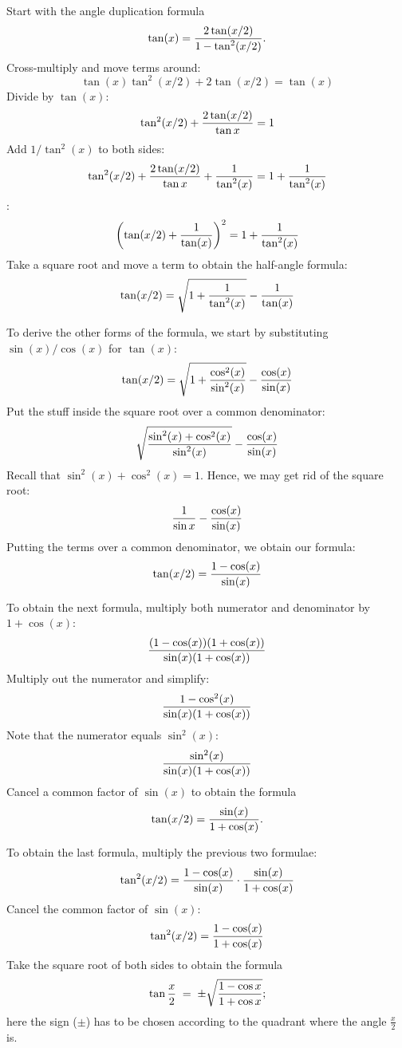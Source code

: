 \documentclass[12pt]{article}
\begin{document}
Start with the angle duplication formula
\[
\tan (x) = {2 \tan (x/2) \over 1 - \tan^2 (x/2)}.
\]
Cross-multiply and move terms around:
\[
\tan (x) \tan^2 (x/2) + 2 \tan (x/2) = \tan (x)
\]
Divide by $\tan (x)$:
\[
\tan^2 (x/2) + {2 \tan (x/2) \over \tan x} = 1
\]
Add $1 / \tan^2 (x)$ to both sides:
\[
\tan^2 (x/2) + {2 \tan (x/2) \over \tan x} + {1 \over \tan^2 (x)} = 1 + {1 \over \tan^2 (x)}
\]
:
\[
\left (\tan (x/2) + {1 \over \tan (x)} \right)^2 =  1 + {1 \over \tan^2 (x)}
\]
Take a square root and move a term to obtain the half-angle formula:
\[
\tan (x/2) = \sqrt{ 1 + {1 \over \tan^2 (x)} } - {1 \over \tan (x)}
\]

To derive the other forms of the formula, we start by substituting
$\sin (x) / \cos (x)$ for $\tan (x)$:
\[
\tan (x/2) = \sqrt{ 1 + {\cos^2 (x) \over \sin^2 (x)}} - 
{\cos (x) \over \sin (x)}
\]
Put the stuff inside the square root over a common denominator:
\[
\sqrt {\sin^2 (x) + \cos^2 (x) \over \sin^2 (x)} - 
{\cos (x) \over \sin (x)}
\]
Recall that $\sin^2 (x) + \cos^2 (x) = 1$.  Hence, we may get rid
of the square root:
\[
{1 \over \sin x} - {\cos (x) \over \sin (x)}
\]
Putting the terms over a common denominator, we obtain our formula:
\[
\tan (x/2) = {1 - \cos (x)  \over \sin (x)}
\]

To obtain the next formula, multiply both numerator and denominator
by $1 + \cos (x)$:
\[
{(1 - \cos (x)) (1 + \cos (x))  \over \sin (x) (1 + \cos (x))}
\]
Multiply out the numerator and simplify:
\[
{1 - \cos^2 (x) \over \sin (x) (1 + \cos (x))}
\]
Note that the numerator equals $\sin^2 (x)$:
\[
{\sin^2 (x) \over \sin (x) (1 + \cos (x))}
\]
Cancel a common factor of $\sin (x)$ to obtain the formula
\[
\tan (x/2) = {\sin (x) \over 1 + \cos (x)} .
\]

To obtain the last formula, multiply the previous two formulae:
\[
\tan^2 (x/2) = {1 - \cos (x)  \over \sin (x)}\cdot
{\sin (x) \over 1 + \cos (x)}
\]
Cancel the common factor of $\sin (x)$:
\[
\tan^2 (x/2) = {1 - \cos (x)  \over 1 + \cos (x)}
\]
Take the square root of both sides to obtain the formula
\[
\tan{\frac{x}{2}}\; = \;\pm\sqrt{1 - \cos{x}  \over 1 + \cos{x}};
\]
here the sign ($\pm$) has to be chosen according to the 
quadrant where the angle $\displaystyle\frac{x}{2}$ is.

\end{document}
